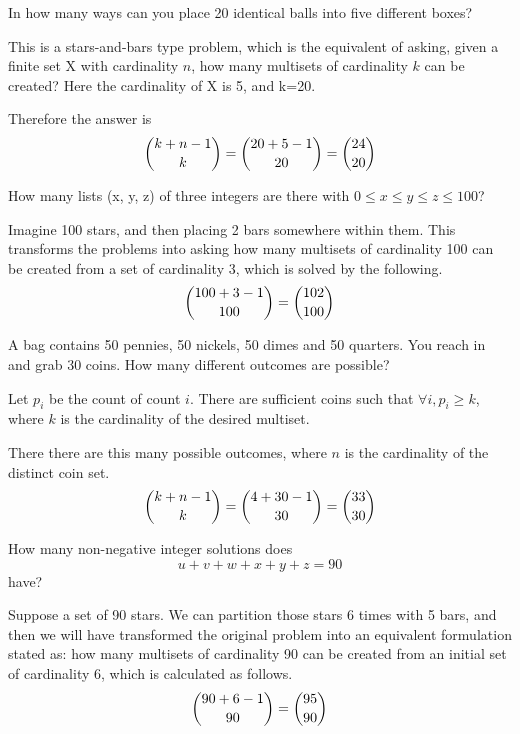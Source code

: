 \documentclass[openany, 12pt]{book}
\begin{document}
\begin{exercise}{}{}
	In how many ways can you place 20 identical balls into five
	different boxes?
	\begin{alist}
		\item This is a stars-and-bars type problem, which is the equivalent of asking,
		given a finite set X with cardinality $n$, how many multisets of cardinality
		$k$ can be created? Here the cardinality of X is 5, and k=20.
		\item Therefore the answer is
		$$ \dbinom{k+n-1}{k} = \dbinom{20+5-1}{20}=\dbinom{24}{20}$$
	\end{alist}
\end{exercise}

\begin{exercise}{}{}
	How many lists (x, y, z) of three integers are there with
	$0 \leq x \leq y \leq z \leq 100$?
	\begin{alist}
		\item  Imagine 100 stars, and then placing 2 bars somewhere within them. This
		transforms the problems into asking how many multisets of cardinality 100
		can be created from a set of cardinality 3, which is solved by the
		following.
		$$ \dbinom{100+3-1}{100} = \dbinom{102}{100}$$
	\end{alist}
\end{exercise}

\begin{exercise}{}{}
	A bag contains 50 pennies, 50 nickels, 50 dimes and 50 quarters. You reach
	in and grab 30 coins. How many different outcomes are possible?
	\begin{alist}
		\item Let $p_i$ be the count of count $i$. There are sufficient coins such that
		$\forall i, p_i\geq k$, where $k$ is the cardinality of the desired
		multiset.
		\item There there are this many possible outcomes, where $n$ is the cardinality
		of the distinct coin set.
		$$ \dbinom{k+n-1}{k} = \dbinom{4+30-1}{30}=\dbinom{33}{30}$$
	\end{alist}
\end{exercise}

\begin{exercise}{}{}
	How many non-negative integer solutions does $$u + v+ w+ x+
		y+ z = 90$$ have?
	\begin{alist}
		\item Suppose a set of 90 stars.  We can partition those stars 6 times with 5
		bars, and then we will have transformed the original problem into an
		equivalent formulation stated as: how many multisets of cardinality 90 can
		be created from an initial set of cardinality 6, which is calculated as
		follows.
		$$ \dbinom{90+6-1}{90} = \dbinom{95}{90}$$
	\end{alist}
\end{exercise}
\end{document}
